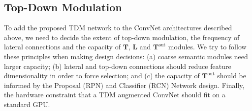 \documentclass[10pt,twocolumn,letterpaper]{article}
\begin{document}
\subsection{Top-Down Modulation}\label{sec:tdm_details}
To add the proposed TDM network to the ConvNet architectures described above, we need to decide the extent of top-down modulation, the frequency of lateral connections and the capacity of $\mathbf{T}$, $\mathbf{L}$ and $\mathbf{T}^\text{out}$ modules. 
We try to follow these principles when making design decisions: (a) coarse semantic modules need larger capacity; (b) lateral and top-down connections should reduce feature dimensionality in order to force selection; and (c) the capacity of $\mathbf{T}^\text{out}$ should be informed by the Proposal (RPN) and Classifier (RCN) Network design. Finally, the hardware constraint that a TDM augmented ConvNet should fit on a standard GPU.
\end{document}
